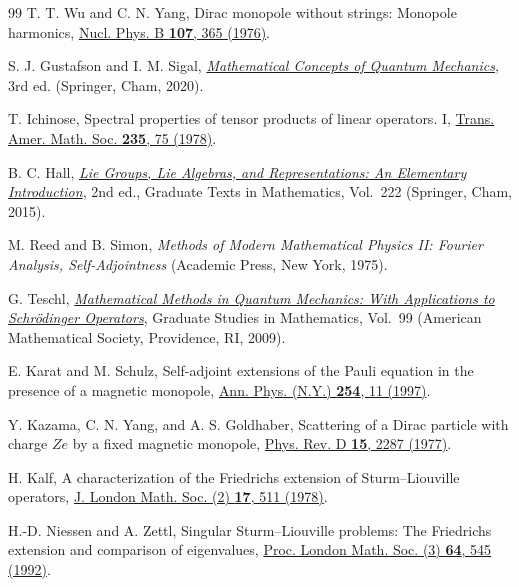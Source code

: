 \documentclass[11pt,a4paper]{article}
\theoremstyle{remark}
\theoremstyle{plain}
\begin{document}
\begin{thebibliography}{99}
T. T. Wu and C. N. Yang,
Dirac monopole without strings: Monopole harmonics,
\href{https://doi.org/10.1016/0550-3213(76)90143-7}
{Nucl. Phys. B \textbf{107}, 365 (1976)}.

S. J. Gustafson and I. M. Sigal,
\href{https://doi.org/10.1007/978-3-030-59562-3}
{\emph{Mathematical Concepts of Quantum Mechanics}},
3rd ed. (Springer, Cham, 2020).

T. Ichinose,
Spectral properties of tensor products of linear operators. I,
\href{https://doi.org/10.1090/S0002-9947-1978-0472915-2}
{Trans. Amer. Math. Soc. \textbf{235}, 75 (1978)}.

B. C. Hall,
\href{https://doi.org/10.1007/978-3-319-13467-3}
{\emph{Lie Groups, Lie Algebras, and Representations:
An Elementary Introduction}},
2nd ed., Graduate Texts in Mathematics, Vol.~222
(Springer, Cham, 2015).

M. Reed and B. Simon,
\emph{Methods of Modern Mathematical Physics II: Fourier Analysis,
Self-Adjointness} (Academic Press, New York, 1975).

G. Teschl,
\href{https://www.mat.univie.ac.at/~gerald/ftp/book-schroe/schroe.pdf}
{\emph{Mathematical Methods in Quantum Mechanics:
With Applications to Schr\"odinger Operators}},
Graduate Studies in Mathematics, Vol.~99
(American Mathematical Society, Providence, RI, 2009).

E. Karat and M. Schulz,
Self-adjoint extensions of the Pauli equation in the presence of a
magnetic monopole,
\href{https://doi.org/10.1006/aphy.1996.5638}
{Ann. Phys. (N.Y.) \textbf{254}, 11 (1997)}.

Y. Kazama, C. N. Yang, and A. S. Goldhaber,
Scattering of a Dirac particle with charge $Ze$ by a fixed magnetic
monopole,
\href{https://doi.org/10.1103/PhysRevD.15.2287}
{Phys. Rev. D \textbf{15}, 2287 (1977)}.

H. Kalf,
A characterization of the Friedrichs extension of Sturm--Liouville
operators,
\href{https://doi.org/10.1112/jlms/s2-17.3.511}
{J. London Math. Soc. (2) \textbf{17}, 511 (1978)}.

H.-D. Niessen and A. Zettl,
Singular Sturm--Liouville problems: The Friedrichs extension and
comparison of eigenvalues,
\href{https://doi.org/10.1112/plms/s3-64.3.545}
{Proc. London Math. Soc. (3) \textbf{64}, 545 (1992)}.

\end{thebibliography}
\end{document}
